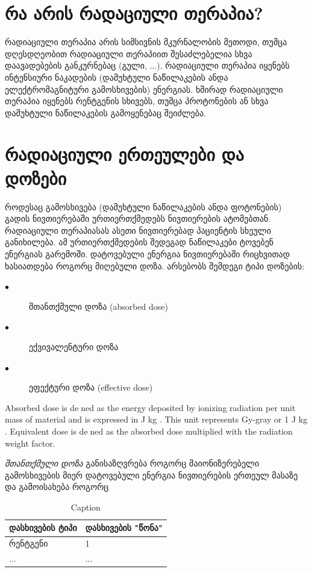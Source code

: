 \documentclass[12pt,a4paper,]{article}
\begin{document}
	\section{რა არის რადაციული თერაპია?}
რადიაციული თერაპია არის სიმსივნის მკურნალობის მეთოდი, თუმცა დღესდღეობით რადიაციული თერაპიით შესაძლებელია სხვა დაავადებების განკურნებაც (გული, ...). რადიაციული თერაპია იყენებს ინტენსიური ნაკადების (დამუხტული ნაწილაკების ანდა ელექტრომაგნიტური გამოსხივების) ენერგიას. ხშირად რადიაციული თერაპია იყენებს რენტგენის სხივებს, თუმცა პროტონების ან სხვა დამუხტული ნაწილაკების გამოყენებაც შეიძლება.
	
	\section{რადიაციული ერთეულები და დოზები}
როდესაც გამოსხივება (დამუხტული ნაწილაკების ანდა ფოტონების) გადის ნივთიერებაში ურთიერთქმედებს ნივთიერების ატომებთან. რადიაციული თერაპიასას ასეთი ნივთიერებად პაციენტის სხეული განიხილება. ამ ურთიერთქმედების შედეგად ნაწილაკები ტოვებენ ენერგიას გარემოში. დატოვებული ენერგია ნივთიერებაში რიცხვითად ხასიათდება როგორც მიღებული დოზა. 
	არსებობს შემდეგი ტიპი დოზების:
	\begin{description}
      \item[$\bullet$] შთანთქმული დოზა  (absorbed dose)
      \item[$\bullet$] ექვივალენტური დოზა
      \item[$\bullet$] ეფექტური დოზა (effective dose)
    \end{description}
    
    Absorbed dose is dened as the energy deposited by ionizing radiation per unit
mass of material and is expressed in J
kg . This unit represents Gy-gray or 1 J
kg .
Equivalent dose is dened as the absorbed dose multiplied with the radiation
weight factor.
    
\textit{შთანთქმული დოზა} განისაზღვრება როგორც მაიონიზერებელი გამოსხივების მიერ დატოვებული ენერგია ნივთიერების ერთეულ მასაზე და გამოისახება როგორც 
    \begin{table}[htp]
        \centering
        \begin{tabular}{l | l}
             დასხივების ტიპი & დასხივების "წონა" \\
             \hline
             \hline
             რენტგენი & 1 \\
             ... & ... \\
        \end{tabular}
        \caption{Caption}
        \label{tab:my_label}
    \end{table}
\end{document}
